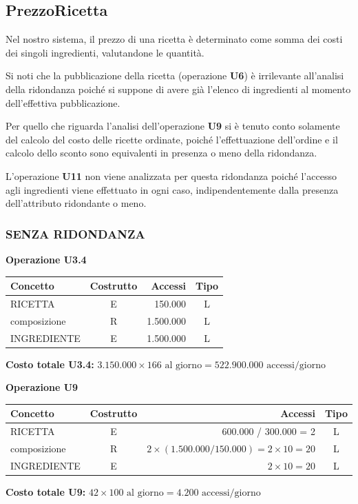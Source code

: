 \subsection{PrezzoRicetta}
Nel nostro sistema, il prezzo di una ricetta è determinato come somma dei costi dei singoli ingredienti, valutandone le quantità.

Si noti che la pubblicazione della ricetta (operazione \textbf{U6}) è irrilevante all’analisi della ridondanza poiché si suppone di avere già l’elenco di ingredienti al momento dell’effettiva pubblicazione.

Per quello che riguarda l’analisi dell’operazione \textbf{U9} si è tenuto conto solamente del calcolo del costo delle ricette ordinate, poiché l’effettuazione dell’ordine e il calcolo dello sconto sono equivalenti in presenza o meno della ridondanza.

L’operazione \textbf{U11} non viene analizzata per questa ridondanza poiché l’accesso agli ingredienti viene effettuato in ogni caso, indipendentemente dalla presenza dell’attributo ridondante o meno.

\subsubsection*{SENZA RIDONDANZA}

\noindent\textbf{Operazione U3.4}
\begin{table}[H]
\centering
\renewcommand{\arraystretch}{1.2}
\setlength{\tabcolsep}{8pt}
\begin{tabularx}{\textwidth}{|X|c|r|c|}
\hline
\textbf{Concetto} & \textbf{Costrutto} & \textbf{Accessi} & \textbf{Tipo} \\
\hline
RICETTA & E & 150.000 & L \\
\hline
composizione & R & 1.500.000 & L \\
\hline
INGREDIENTE & E & 1.500.000 & L \\
\hline
\end{tabularx}
\end{table}
\textbf{Costo totale U3.4:} $3.150.000 \times 166 \mbox{ al giorno} = 522.900.000 \mbox{ accessi/giorno}$

\vspace{1.5em}

\noindent\textbf{Operazione U9}
\begin{table}[H]
\centering
\renewcommand{\arraystretch}{1.2}
\setlength{\tabcolsep}{8pt}
\begin{tabularx}{\textwidth}{|X|c|r|c|}
\hline
\textbf{Concetto} & \textbf{Costrutto} & \textbf{Accessi} & \textbf{Tipo} \\
\hline
RICETTA & E & 600.000 / 300.000 = 2 & L \\
\hline
composizione & R & $2 \times (1.500.000 / 150.000) = 2 \times 10 = 20$ & L \\
\hline
INGREDIENTE & E & $2 \times 10 = 20$ & L \\
\hline
\end{tabularx}
\end{table}
\textbf{Costo totale U9:} $42 \times 100 \mbox{ al giorno} = 4.200 \mbox{ accessi/giorno}$


